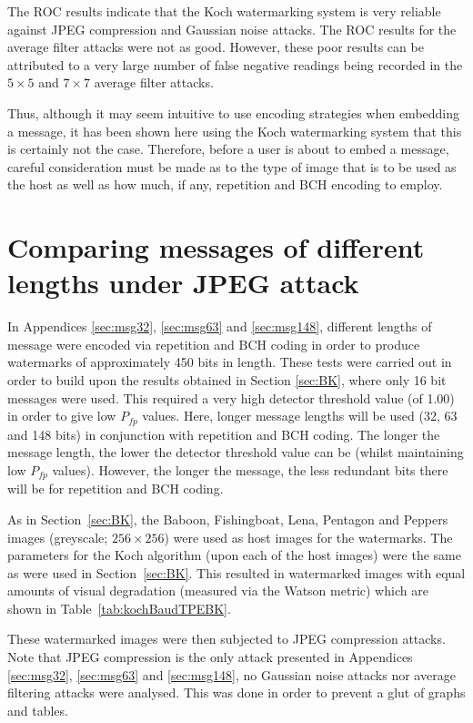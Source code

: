 \documentclass[12pt]{report}
\begin{document}
The ROC results indicate that the Koch watermarking system is 
very reliable against JPEG compression and Gaussian noise attacks.
The ROC results for the average filter attacks were not as good.
However, these poor results 
can be attributed to a very large number of false
negative readings being recorded in the $5\times5$ and $7\times7$ average filter attacks.

Thus, although it may seem intuitive to use encoding strategies 
when embedding a message, it has been shown here using the Koch watermarking system 
that this is certainly not the case. 
Therefore, before a user is about to embed a message, careful consideration must be made as to the type
of image that is to be used as the host as well as how much, if any, repetition and BCH encoding to employ.



\section{Comparing messages of different lengths under JPEG attack}
\label{sec:diffMsgLen}
In Appendices \ref{sec:msg32}, \ref{sec:msg63} and \ref{sec:msg148}, 
different lengths of message were encoded via 
repetition and BCH coding in order to produce watermarks of approximately 450 bits
in length. 
These tests were carried out in order to build upon the results obtained in 
Section \ref{sec:BK}, where only 16 bit
messages were used. This required a very high detector threshold value
(of 1.00) in order to give low $P_{fp}$ values. 
Here, longer message lengths will be used (32, 63 and 148 bits) in conjunction with repetition
and BCH coding. The longer the message length, the lower the detector threshold 
value can be (whilst maintaining low $P_{fp}$ values). However, the longer the
message, the less redundant bits there will be for repetition and BCH coding.

As in Section~\ref{sec:BK}, 
the Baboon, Fishingboat, Lena, Pentagon and Peppers images
(greyscale; $256 \times 256$) were used as host images for the watermarks. 
The parameters for the Koch algorithm (upon each of the host images) were the same as were used in 
Section~\ref{sec:BK}.
This resulted in watermarked images with equal amounts of visual 
degradation (measured via the Watson metric) which are shown in Table~\ref{tab:kochBaudTPEBK}.

These watermarked images were then subjected to JPEG compression attacks. Note that
JPEG compression is the only attack presented in
Appendices \ref{sec:msg32}, \ref{sec:msg63} and \ref{sec:msg148}, no Gaussian noise attacks nor
average filtering attacks were analysed.
This was done in order to prevent a glut of graphs and tables.
\end{document}

